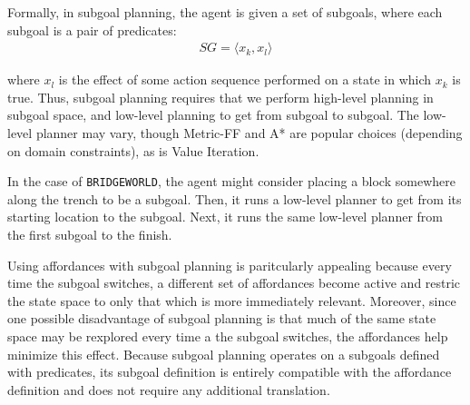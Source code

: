\documentclass[]{article}
\begin{document}
Formally, in subgoal planning, the agent is given a set of subgoals, where each subgoal is a pair of predicates:
\begin{align}
SG = \langle x_k, x_l \rangle
\end{align}

where $x_l$ is the effect of some action sequence performed on 
a state in which $x_k$ is true. Thus, subgoal planning requires 
that we perform high-level planning in subgoal space, and low-level 
planning to get from subgoal to subgoal. The low-level planner may vary, though
Metric-FF and A* are popular choices (depending on domain constraints), as is Value Iteration.

In the case of \texttt{BRIDGEWORLD}, the agent might consider placing
a block somewhere along the trench to be a subgoal. Then, it runs
a low-level planner to get from its starting location to the subgoal.
Next, it runs the same low-level planner from the first subgoal to the finish.


Using affordances with subgoal planning is paritcularly appealing because
every time the subgoal switches, a different set of affordances become
active and restric the state space to only that which is
more immediately relevant. Moreover, since one possible disadvantage of subgoal
planning is that much of the same state space may be rexplored
every time a the subgoal switches, the affordances help minimize
this effect. Because subgoal planning operates on a subgoals defined with predicates,
its subgoal definition is entirely compatible with the affordance
definition and does not require any additional translation.
\end{document}
